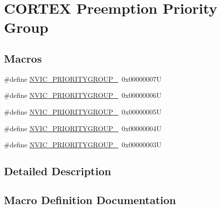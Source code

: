 \hypertarget{group___c_o_r_t_e_x___preemption___priority___group}{}\section{C\+O\+R\+T\+EX Preemption Priority Group}
\label{group___c_o_r_t_e_x___preemption___priority___group}
\subsection*{Macros}
\begin{DoxyCompactItemize}
\item 
\#define \hyperlink{group___c_o_r_t_e_x___preemption___priority___group_ga5e97dcff77680602c86e44f23f5ffa1a}{N\+V\+I\+C\+\_\+\+P\+R\+I\+O\+R\+I\+T\+Y\+G\+R\+O\+U\+P\+\_}~0x00000007U
\item 
\#define \hyperlink{group___c_o_r_t_e_x___preemption___priority___group_ga702227137b010421c3a3b6434005a132}{N\+V\+I\+C\+\_\+\+P\+R\+I\+O\+R\+I\+T\+Y\+G\+R\+O\+U\+P\+\_}~0x00000006U
\item 
\#define \hyperlink{group___c_o_r_t_e_x___preemption___priority___group_gaa43a3fd37850c120ce567ab2743d11b4}{N\+V\+I\+C\+\_\+\+P\+R\+I\+O\+R\+I\+T\+Y\+G\+R\+O\+U\+P\+\_}~0x00000005U
\item 
\#define \hyperlink{group___c_o_r_t_e_x___preemption___priority___group_ga8ddb24962e6f0fc3273139d45d374b09}{N\+V\+I\+C\+\_\+\+P\+R\+I\+O\+R\+I\+T\+Y\+G\+R\+O\+U\+P\+\_}~0x00000004U
\item 
\#define \hyperlink{group___c_o_r_t_e_x___preemption___priority___group_gae6eab9140204bc938255aa148e597c45}{N\+V\+I\+C\+\_\+\+P\+R\+I\+O\+R\+I\+T\+Y\+G\+R\+O\+U\+P\+\_}~0x00000003U
\end{DoxyCompactItemize}


\subsection{Detailed Description}


\subsection{Macro Definition Documentation}
\mbox{\label{group___c_o_r_t_e_x___preemption___priority___group_ga5e97dcff77680602c86e44f23f5ffa1a}} 
